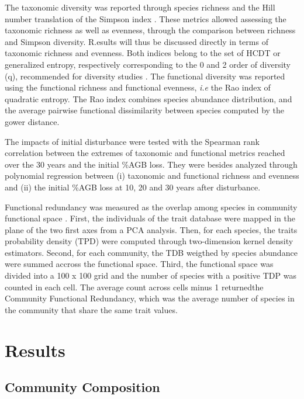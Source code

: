 \documentclass[fleqn,10pt]{ArtEcoFoG} %
\begin{document}
The taxonomic diversity was reported through species richness and the
Hill number translation of the Simpson index \citep{Hill1973}. These
metrics allowed assessing the taxonomic richness as well as evenness,
through the comparison between richness and Simpson diversity. R.esults
will thus be discussed directly in terms of taxonomic richness and
evenness. Both indices belong to the set of HCDT or generalized entropy,
respectively corresponding to the 0 and 2 order of diversity (q),
recommended for diversity studies \citep{Marcon2015b}. The functional
diversity was reported using the functional richness and functional
evenness, \emph{i.e} the Rao index of quadratic entropy. The Rao index
combines species abundance distribution, and the average pairwise
functional dissimilarity between species computed by the gower distance.

The impacts of initial disturbance were tested with the Spearman rank
correlation between the extremes of taxonomic and functional metrics
reached over the 30 years and the initial \%AGB loss. They were besides
analyzed through polynomial regression between (i) taxonomic and
functional richness and evenness and (ii) the initial \%AGB loss at 10,
20 and 30 years after disturbance.

Functional redundancy was measured as the overlap among species in
community functional space \citep{Carmona2016}. First, the individuals
of the trait database were mapped in the plane of the two first axes
from a PCA analysis. Then, for each species, the traits probability
density (TPD) were computed through two-dimension kernel density
estimators. Second, for each community, the TDB weigthed by species
abundance were summed accross the functional space. Third, the
functional space was divided into a 100 x 100 grid and the number of
species with a positive TDP was counted in each cell. The average count
across cells minus 1 returnedthe Community Functional Redundancy, which
was the average number of species in the community that share the same
trait values.

\section{Results}\label{results}

\subsection{Community Composition}\label{community-composition}
\end{document}
